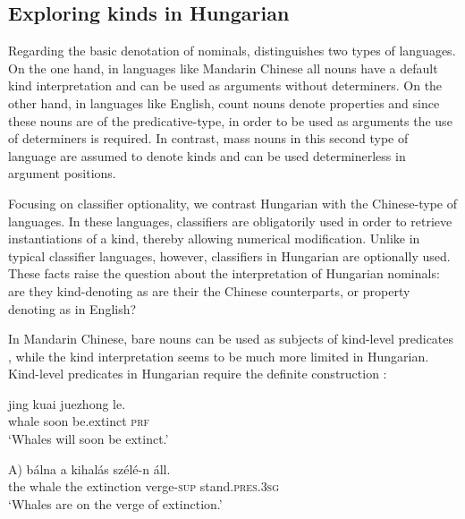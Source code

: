 \documentclass[output=paper]{langscibook}
\begin{document}
\subsection{Exploring kinds in Hungarian} \label{schv-nem:sec:4.1}

Regarding the basic denotation of nominals, \citet{chierchia-98b} distinguishes two types of languages. On the one hand, in languages like Mandarin Chinese all nouns have a default kind interpretation and can be used as arguments without determiners. On the other hand, in languages like English, count nouns denote properties and since these nouns are of the predicative-type, in order to be used as arguments the use of determiners is required. In contrast, mass nouns in this second type of language are assumed to denote kinds and can be used determinerless in argument positions.  

Focusing on classifier optionality, we contrast Hungarian with the Chinese-type of languages. In these languages, classifiers are obligatorily used in order to retrieve instantiations of a kind, thereby allowing numerical modification. Unlike in typical classifier languages, however, classifiers in Hungarian are optionally used. These facts raise the question about the interpretation of Hungarian nominals: are they kind-denoting as are their the Chinese counterparts, or property denoting as in English?

In Mandarin Chinese, bare nouns can be used as subjects of kind-level predicates  \citep{li-13}, while the kind interpretation seems to be much more limited in Hungarian. Kind-level predicates in Hungarian require the definite construction :

\ea \label{schv-nem:ex:37} \gll jing kuai juezhong le.\\  
whale soon be.extinct \textsc{prf}\\
\glt `Whales will soon be extinct.'\hfill \citep[Mandarin Chinese;][p. 90, ex. (4)]{li-13}


\ex \gll \minsp{*(} A) bálna a kihalás szélé-n áll.\\  
{} the whale the extinction verge-\textsc{sup} stand.\textsc{pres}.\textsc{3sg}\\ 
\glt `Whales are on the verge of extinction.' \label{schv-nem:ex:38}
\z
\end{document}
